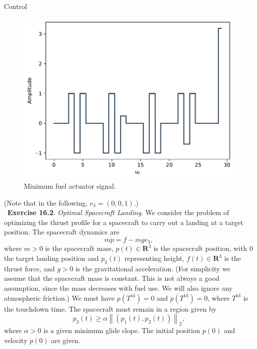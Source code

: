 \begin{chapter}{Control}
    \begin{figure}[h]
        \centering
        \includegraphics[width=\linewidth]{examples/364a/cvx-ch4/4-16_min-fuel.pdf}
        \caption{Minimum fuel actuator signal.}
        \label{fig:4-16_min-fuel}
    \end{figure}
    
    \vspace*{.5cm}

    \noindent(Note that in the following, $e_3 = (0, 0, 1)$.)\\
    \noindent~\cite{EE364a-extra}\textbf{Exercise 16.2}. \textit{Optimal Spacecraft Landing}. 
    We consider the problem of optimizing the thrust profile for a spacecraft
    to carry out a landing at a target position. The spacecraft dynamics are
    \[
    m \ddot{p}=f-m g e_3,
    \]
    where $m>0$ is the spacecraft mass, $p(t) \in \mathbf{R}^3$ is the spacecraft position, with 0 the target landing position and $p_3(t)$ representing height,
    $f(t) \in \mathbf{R}^3$ is the thrust force, and $g>0$ is the gravitational acceleration.
    (For simplicity we assume that the spacecraft mass is constant. This is not always a good assumption, since the mass decreases with fuel use.
    We will also ignore any atmospheric friction.) We must have $p\left(T^{\mathrm{td}}\right)=0$ and $\dot{p}\left(T^{\mathrm{td}}\right)=0$,
    where $T^{\mathrm{td}}$ is the touchdown time. The spacecraft must remain in a region given by
    \[
    p_3(t) \geq \alpha\left\|\left(p_1(t), p_2(t)\right)\right\|_2,
    \]
    where $\alpha>0$ is a given minimum glide slope. The initial position $p(0)$ and velocity $\dot{p}(0)$ are given.


\end{chapter}
